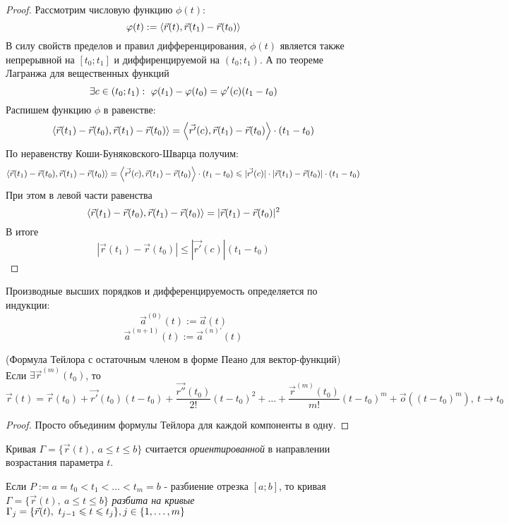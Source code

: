 \begin{proof}
	Рассмотрим числовую функцию $\phi(t)$:
	\[
		\varphi(t) := \left\langle\vec{r}(t), \vec{r}(t_1) - \vec{r}(t_0)\right\rangle
	\]
	В силу свойств пределов и правил дифференцирования, $\phi(t)$ является также непрерывной на $[t_0; t_1]$ и диффиренцируемой на $(t_0; t_1)$. А по теореме Лагранжа для вещественных функций
	\[
		\exists c \in (t_0; t_1) :\  \varphi(t_1) - \varphi(t_0) = \varphi'(c)(t_1 - t_0)
	\]
	Распишем функцию $\phi$ в равенстве:
	\[
		\left\langle\vec{r}(t_1) - \vec{r}(t_0), \vec{r}(t_1) - \vec{r}(t_0)\right\rangle = \left\langle\vec{r'}(c), \vec{r}(t_1) - \vec{r}(t_0)\right\rangle \cdot (t_1 - t_0)
	\]
	По неравенству Коши-Буняковского-Шварца получим:
	\[
		\left\langle\vec{r}(t_1) - \vec{r}(t_0), \vec{r}(t_1) - \vec{r}(t_0)\right\rangle = \left\langle\vec{r'}(c), \vec{r}(t_1) - \vec{r}(t_0)\right\rangle \cdot (t_1 - t_0) \leqslant |\vec{r'}(c)| \cdot |\vec{r}(t_1) - \vec{r}(t_0)| \cdot (t_1 - t_0)
	\]
	При этом в левой части равенства
	\[
		\left\langle\vec{r}(t_1) - \vec{r}(t_0), \vec{r}(t_1) - \vec{r}(t_0)\right\rangle = |\vec{r}(t_1) - \vec{r}(t_0)|^2
	\]
	В итоге
	\[
		|\vec{r}(t_1) - \vec{r}(t_0)| \le |\vec{r'}(c)|(t_1 - t_0)
	\]
\end{proof}

\begin{definition}
	Производные высших порядков и дифференцируемость определяется по индукции:
	\[
		\vec{a}^{(0)}(t) := \vec{a}(t)
	\]
	\[
		\vec{a}^{(n + 1)}(t) := \vec{a}^{(n)'}(t)
	\]
\end{definition}

\begin{theorem} (Формула Тейлора с остаточным членом в форме Пеано для вектор-функций)
	Если $\exists \vec{r}^{(m)}(t_0)$, то
	\[
		\vec{r}(t) = \vec{r}(t_0) + \vec{r'}(t_0)(t - t_0) + \frac{\vec{r''}(t_0)}{2!}(t - t_0)^2 + \ldots + \frac{\vec{r}^{(m)}(t_0)}{m!}(t - t_0)^m + \vec{o}\left((t - t_0)^m\right),\ t \to t_0
	\]
\end{theorem}

\begin{proof}
	Просто объединим формулы Тейлора для каждой компоненты в одну.
\end{proof}

\begin{definition}
	Кривая $\Gamma = \{\vec{r}(t),\ a \le t \le b\}$ считается \textit{ориентированной} в направлении возрастания параметра $t$.
\end{definition}

\begin{definition}
	Если $P := a = t_0 < t_1 < \ldots < t_m = b$ - разбиение отрезка $[a; b]$, то кривая $\Gamma = \{\vec{r}(t),\ a \le t \le b\}$ \textit{разбита на кривые} $\Gamma_j = \{\vec{r}(t),\ t_{j - 1} \leqslant t \leqslant t_j\}, j \in \{1, \ldots, m\}$
\end{definition}

